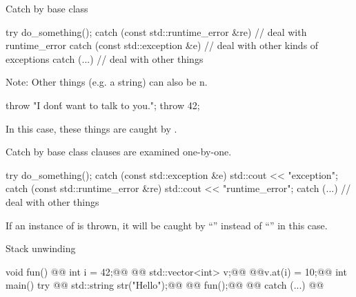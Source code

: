 \documentclass[aspectratio=169]{beamer}
\begin{document}
\begin{frame}[fragile]{Catch by base class}
  \begin{cpp}
    try {
      do_something();
    } catch (const std::runtime_error &re) {
      // deal with runtime_error
    } catch (const std::exception &e) {
      // deal with other kinds of exceptions
    } catch (...) {
      // deal with other things
    }
  \end{cpp}
  \pause
  Note: Other things (e.g. a string) can also be n.
  \begin{cpp}
    throw "I don\'t want to talk to you.";
    throw 42;
  \end{cpp}
  In this case, these things are caught by .
\end{frame}

\begin{frame}[fragile]{Catch by base class}
   clauses are examined one-by-one.
  \begin{cpp}
    try {
      do_something();
    } catch (const std::exception &e) {
      std::cout << "exception\n";
    } catch (const std::runtime_error &re) {
      std::cout << "runtime_error\n";
    } catch (...) {
      // deal with other things
    }
  \end{cpp}
  If an instance of  is thrown, it will be caught by ``'' instead of ``'' in this case.
\end{frame}

\begin{frame}[fragile]{Stack unwinding}
  \begin{cpp}[\small]
    void fun() {
@@      int i = 42;@@
@@      std::vector<int> v;@@
    @@v.at(i) = 10;@@
    }
    int main() {
      try {
@@        std::string str("Hello");@@
@@        fun();@@
@@      } catch (...) {}@@
    }
  \end{cpp}
\end{frame}
\end{document}
